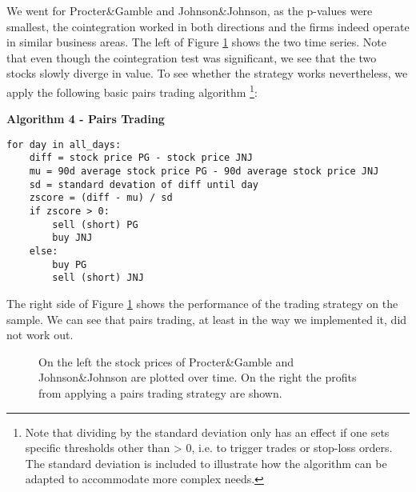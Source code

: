 We went for Procter\&Gamble and Johnson\&Johnson, as the p-values were smallest, the cointegration worked in both directions and the firms indeed operate in similar business areas. The left of Figure \ref{fig:coint_PG_JNJ} shows the two time series. Note that even though the cointegration test was significant, we see that the two stocks slowly diverge in value. To see whether the strategy works nevertheless, we apply the following basic pairs trading algorithm \footnote{Note that dividing by the standard deviation only has an effect if one sets specific thresholds other than > 0, i.e. to trigger trades or stop-loss orders. The standard deviation is included to illustrate how the algorithm can be adapted to accommodate more complex needs.}: 

\vspace{2ex}
\textbf{\small{Algorithm 4 - Pairs Trading}}
\vspace{-1ex}
\begin{verbatim}
for day in all_days: 
    diff = stock price PG - stock price JNJ
    mu = 90d average stock price PG - 90d average stock price JNJ
    sd = standard devation of diff until day
    zscore = (diff - mu) / sd
    if zscore > 0:
        sell (short) PG
        buy JNJ
    else:
        buy PG
        sell (short) JNJ
\end{verbatim}

The right side of Figure \ref{fig:coint_PG_JNJ} shows the performance of the trading strategy on the sample. We can see that pairs trading, at least in the way we implemented it, did not work out. 

\begin{figure}[h!]
    \centering
    \begin{adjustbox}{width=.95\textwidth,center}
        
        
    \end{adjustbox}  
    \caption{On the left the stock prices of Procter\&Gamble and Johnson\&Johnson are plotted over time. On the right the profits from applying a pairs trading strategy are shown.}
    \label{fig:coint_PG_JNJ}
\end{figure}{}